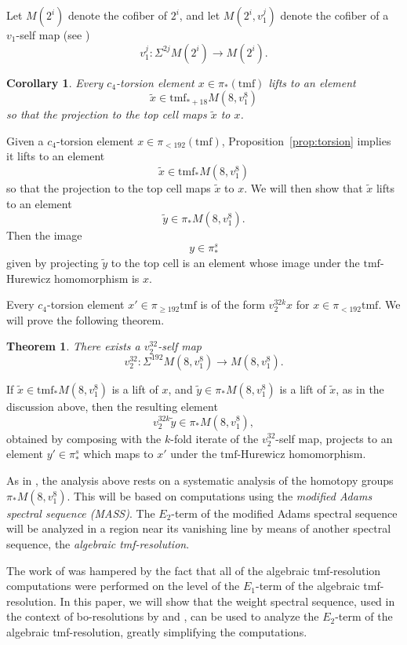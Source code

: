\documentclass[10pt]{amsart}
\newcommand{\td}[1]{\widetilde{#1}}
\newcommand{\tmf}{\mathrm{tmf}}
\newtheorem{thm}[equation]{Theorem}
\newtheorem{cor}[equation]{Corollary}
\theoremstyle{definition}
\numberwithin{equation}{section}
\numberwithin{figure}{section}
\begin{document}
Let $M(2^i)$ denote the cofiber of $2^i$, and let $M(2^i,v_1^j)$ denote the cofiber of a $v_1$-self map (see \cite[Prop.~2.3]{DavisMahowald})
$$ v_1^j: \Sigma^{2j}M(2^i) \rightarrow M(2^i). $$

\begin{cor}
Every $c_4$-torsion element 
$x \in  \pi_{*}(\tmf)$ lifts to an element 
$$ \td{x} \in \tmf_{*+18} M(8, v_1^8) $$
so that the projection to the top cell maps $\td{x}$ to $x$.
\end{cor}

Given a $c_4$-torsion element 
$x \in  \pi_{< 192}(\tmf)$, Proposition~\ref{prop:torsion} implies it lifts to an element 
$$ \td{x} \in \tmf_* M(8, v_1^8) $$
so that the projection to the top cell maps $\td{x}$ to $x$.  We will then show that $\td{x}$ lifts to an element 
$$ \td{y} \in \pi_*M(8, v_1^8). $$ 
Then the image 
$$ y \in \pi_*^s $$
given by projecting $\td{y}$ to the top cell is an element whose image under the $\tmf$-Hurewicz homomorphism is $x$.  

Every $c_4$-torsion element $x' \in \pi_{\ge 192} \tmf$ is of the form $v_2^{32k} x$ for $x \in \pi_{<192}\tmf$.  We will prove the following theorem.

\begin{thm}\label{thm:v232}
There exists a $v_2^{32}$-self map
$$ v_2^{32}: \Sigma^{192} M(8,v_1^8) \rightarrow M(8,v_1^8). $$
\end{thm}

If $\td{x} \in \tmf_*M(8,v_1^8)$ is a lift of $x$, and $\td{y} \in \pi_*M(8,v_1^8)$ is a lift of $\td{x}$, as in the discussion above, then the resulting element
$$ v_2^{32k} \td{y} \in \pi_*M(8,v_1^8), $$
obtained by composing with the $k$-fold iterate of the $v_2^{32}$-self map, projects to an element $y' \in \pi_*^s$ which maps to $x'$ under the $\tmf$-Hurewicz homomorphism. 

As in \cite{BHHM2}, the analysis above rests on a systematic analysis of the homotopy groups $\pi_*M(8,v_1^8)$.  This will be based on computations using the \emph{modified Adams spectral sequence (MASS)}.  The $E_2$-term of the modified Adams spectral sequence will be analyzed in a region near its vanishing line by means of another spectral sequence, the \emph{algebraic tmf-resolution}.  

The work of \cite{BHHM2} was hampered by the fact that all of the algebraic tmf-resolution computations were performed on the level of the $E_1$-term of the algebraic tmf-resolution.  In this paper, we will show that the weight spectral sequence, used in the context of bo-resolutions by \cite{LellmannMahowald} and \cite{boass}, can be used to analyze the $E_2$-term of the algebraic tmf-resolution, greatly simplifying the computations.  
\end{document}

